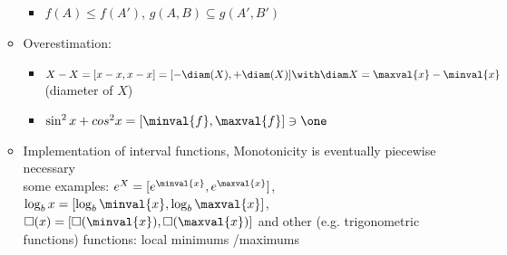 \begin{itemize}
\begin{itemize}
\begin{itemize}
			\item $f(A)\le f(A')$, $g(A,B)\subseteq g(A', B')$
		\end{itemize}
		\item Overestimation:
		\begin{itemize}
			\item $X-X=[x-x,x-x]=[-\diam(X),+\diam(X)] \with \diam X=\maxval{x}-\minval{x}$ (diameter of $X$)
			\item $\sin^2 x + cos^2 x=[\minval{f},\maxval{f}]\ni \one$
		\end{itemize} 
		\item Implementation of interval functions, Monotonicity is eventually piecewise necessary\\
		some examples: $e^X=[e^{\minval{x}},e^{\maxval{x}}]$, $\log_b x=[\log_b \minval{x}, \log_b \maxval{x}]$, $\square(x)=[\square(\minval{x}),\square(\maxval{x})]$ and other (e.g. trigonometric functions) functions: local minimums /maximums
	\end{itemize}
\end{itemize}
